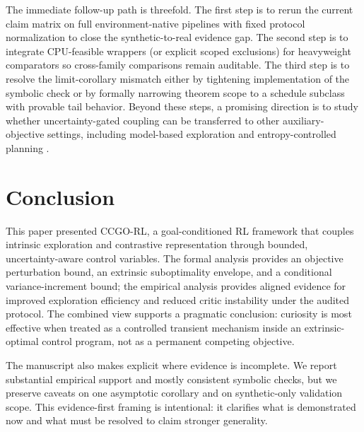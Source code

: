 \documentclass{article} %
\begin{document}
The immediate follow-up path is threefold. The first step is to rerun the current claim matrix on full environment-native pipelines with fixed protocol normalization to close the synthetic-to-real evidence gap. The second step is to integrate CPU-feasible wrappers (or explicit scoped exclusions) for heavyweight comparators so cross-family comparisons remain auditable. The third step is to resolve the limit-corollary mismatch either by tightening implementation of the symbolic check or by formally narrowing theorem scope to a schedule subclass with provable tail behavior. Beyond these steps, a promising direction is to study whether uncertainty-gated coupling can be transferred to other auxiliary-objective settings, including model-based exploration and entropy-controlled planning \citep{arxiv2005_05960, arxiv2301_04104, arxiv2310_16828}.

\section{Conclusion}
\label{sec:conclusion}

This paper presented CCGO-RL, a goal-conditioned RL framework that couples intrinsic exploration and contrastive representation through bounded, uncertainty-aware control variables. The formal analysis provides an objective perturbation bound, an extrinsic suboptimality envelope, and a conditional variance-increment bound; the empirical analysis provides aligned evidence for improved exploration efficiency and reduced critic instability under the audited protocol. The combined view supports a pragmatic conclusion: curiosity is most effective when treated as a controlled transient mechanism inside an extrinsic-optimal control program, not as a permanent competing objective.

The manuscript also makes explicit where evidence is incomplete. We report substantial empirical support and mostly consistent symbolic checks, but we preserve caveats on one asymptotic corollary and on synthetic-only validation scope. This evidence-first framing is intentional: it clarifies what is demonstrated now and what must be resolved to claim stronger generality.

\clearpage{}\label{sec:end_of_main}








\appendix

\clearpage{}\label{sec:appendix_start}
\end{document}
